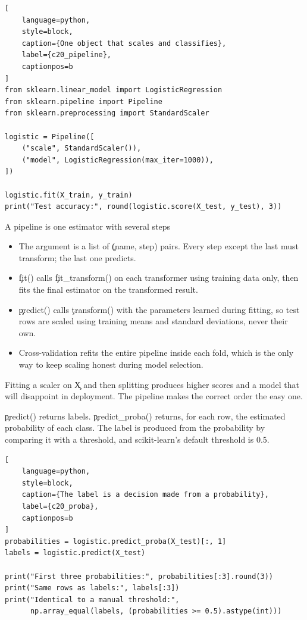 \begin{lstlisting}[
    language=python,
    style=block,
    caption={One object that scales and classifies},
    label={c20_pipeline},
    captionpos=b
]
from sklearn.linear_model import LogisticRegression
from sklearn.pipeline import Pipeline
from sklearn.preprocessing import StandardScaler

logistic = Pipeline([
    ("scale", StandardScaler()),
    ("model", LogisticRegression(max_iter=1000)),
])

logistic.fit(X_train, y_train)
print("Test accuracy:", round(logistic.score(X_test, y_test), 3))
\end{lstlisting}

\begin{SyntaxBox}{A pipeline is one estimator with several steps}
\begin{itemize}
    \item The argument is a list of \c{(name, step)} pairs. Every step except
          the last must transform; the last one predicts.
    \item \c{fit()} calls \c{fit_transform()} on each transformer using training
          data only, then fits the final estimator on the transformed result.
    \item \c{predict()} calls \c{transform()} with the parameters learned during
          fitting, so test rows are scaled using training means and standard
          deviations, never their own.
    \item Cross-validation refits the entire pipeline inside each fold, which is
          the only way to keep scaling honest during model selection.
\end{itemize}
Fitting a scaler on \c{X} and then splitting produces higher scores and a model
that will disappoint in deployment. The pipeline makes the correct order the
easy one.
\end{SyntaxBox}


\c{predict()} returns labels. \c{predict_proba()} returns, for each row, the
estimated probability of each class. The label is produced from the probability
by comparing it with a threshold, and scikit-learn's default threshold is 0.5.

\begin{lstlisting}[
    language=python,
    style=block,
    caption={The label is a decision made from a probability},
    label={c20_proba},
    captionpos=b
]
probabilities = logistic.predict_proba(X_test)[:, 1]
labels = logistic.predict(X_test)

print("First three probabilities:", probabilities[:3].round(3))
print("Same rows as labels:", labels[:3])
print("Identical to a manual threshold:",
      np.array_equal(labels, (probabilities >= 0.5).astype(int)))
\end{lstlisting}


